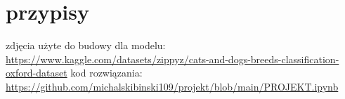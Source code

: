 \documentclass[a4paper,12pt]{scrartcl}
\begin{document}
\section{przypisy}
zdjęcia użyte do budowy dla modelu:\\ 
\href{https://www.kaggle.com/datasets/zippyz/cats-and-dogs-breeds-classification-oxford-dataset}
{https://www.kaggle.com/datasets/zippyz/cats-and-dogs-breeds-classification-oxford-dataset}
kod rozwiązania:\\
\href{https://github.com/michalskibinski109/projekt/blob/main/PROJEKT.ipynb}
{https://github.com/michalskibinski109/projekt/blob/main/PROJEKT.ipynb}
\end{document}
